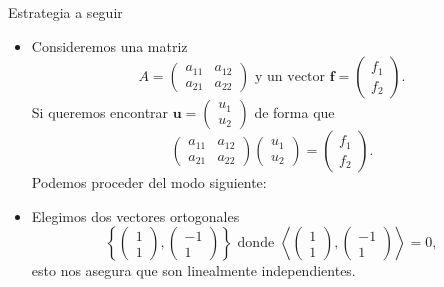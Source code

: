 \documentclass[10pt,handout]{beamer}
\theoremstyle{plain} %
\theoremstyle{plain} %
\theoremstyle{plain} %
\theoremstyle{plain} %
\theoremstyle{definition}
\theoremstyle{example}
\theoremstyle{example}
\theoremstyle{remark}
\theoremstyle{remark}
\begin{document}
\begin{frame}{Estrategia a seguir}
\begin{itemize}
\item Consideremos una matriz
$$
A= \left(
\begin{array}{cc}
a_{11} & a_{12} \\ 
a_{21} & a_{22}
\end{array}
\right) \text{ y un vector } \mathbf{f}=\left(
\begin{array}{c}
f_1 \\ 
f_2
\end{array}
\right).
$$
Si queremos encontrar $\mathbf{u} = \left(
\begin{array}{c}
u_1 \\ 
u_2
\end{array}
\right)$ de forma que
$$
\left(
\begin{array}{cc}
a_{11} & a_{12} \\ 
a_{21} & a_{22}
\end{array}
\right) \left(
\begin{array}{c}
u_1 \\ 
u_2
\end{array}
\right)=\left(
\begin{array}{c}
f_1 \\ 
f_2
\end{array}
\right).
$$
Podemos proceder del modo siguiente:
\item Elegimos dos vectores ortogonales
$$
\left\{
\left(
\begin{array}{c}
1 \\ 
1
\end{array}
\right), \left(
\begin{array}{r}
-1 \\ 
1
\end{array}
\right)
\right\} \text{ donde } \left\langle \left(
\begin{array}{c}
1 \\ 
1
\end{array}
\right), \left(
\begin{array}{r}
-1 \\ 
1
\end{array}
\right) \right\rangle = 0,
$$
esto nos asegura que son linealmente independientes.
\end{itemize}
\end{frame}
\end{document}
